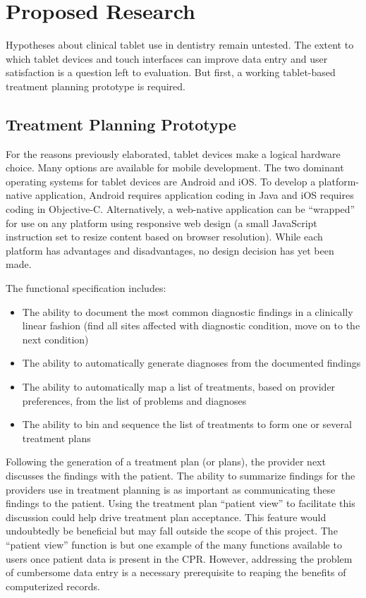 \documentclass[11pt]{article}
\begin{document}
\section{Proposed Research}
Hypotheses about clinical tablet use in dentistry remain untested. The extent to which tablet devices and touch interfaces can improve data entry and user satisfaction is a question left to evaluation. But first, a working tablet-based treatment planning prototype is required.

\subsection{Treatment Planning Prototype}

For the reasons previously elaborated, tablet devices make a logical hardware choice. Many options are available for mobile development. The two dominant operating systems for tablet devices are Android and iOS. To develop a platform-native application, Android requires application coding in Java and iOS requires coding in Objective-C. Alternatively, a web-native application can be ``wrapped'' for use on any platform using responsive web design (a small JavaScript instruction set to resize content based on browser resolution). While each platform has advantages and disadvantages, no design decision has yet been made.

The functional specification includes:

\begin{itemize}
\item The ability to document the most common diagnostic findings in a clinically linear fashion (find all sites affected with diagnostic condition, move on to the next condition)
\item The ability to automatically generate diagnoses from the documented findings
\item The ability to automatically map a list of treatments, based on provider preferences, from the list of problems and diagnoses
\item The ability to bin and sequence the list of treatments to form one or several treatment plans
\end{itemize}

Following the generation of a treatment plan (or plans), the provider next discusses the findings with the patient. The ability to summarize findings for the providers use in treatment planning is as important as communicating these findings to the patient. Using the treatment plan ``patient view'' to facilitate this discussion could help drive treatment plan acceptance. This feature would undoubtedly be beneficial but may fall outside the scope of this project. The ``patient view'' function is but one example of the many functions available to users once patient data is present in the CPR. However, addressing the problem of cumbersome data entry is a necessary prerequisite to reaping the benefits of computerized records.
\end{document}
